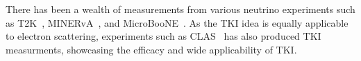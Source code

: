 There has been a wealth of measurements from various neutrino experiments such as  T2K~\cite{T2K:2018rnz, T2K:2021naz}, MINERvA~\cite{MINERvA:2018hba, MINERvA:2019ope, MINERvA:2020anu, MINERvA:2021csy}, and MicroBooNE~\cite{MicroBooNE:2022emb, MicroBooNE:2023cmw, MicroBooNE:2023tzj, MicroBooNE:2023wzy, MicroBooNE:2024tmp}.
As the TKI idea is equally applicable to electron scattering, experiments such as CLAS~\cite{CLAS:2021neh} has also produced TKI measurments, showcasing the efficacy and wide applicability of TKI. 





